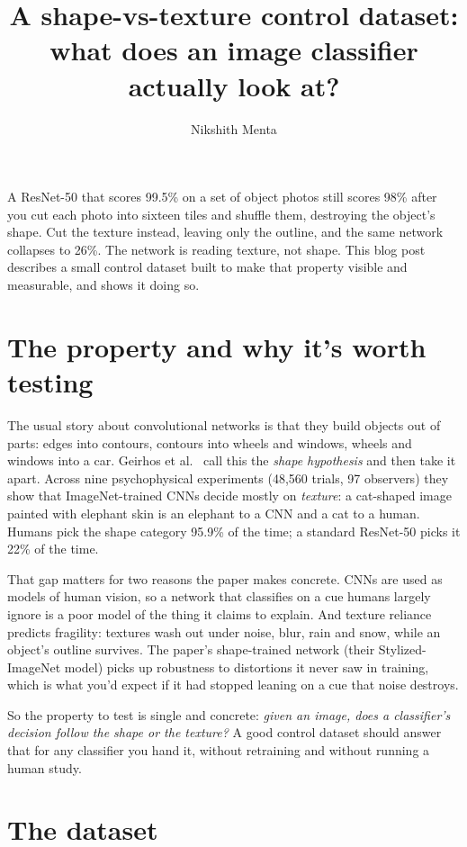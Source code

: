 \documentclass[11pt]{article}
\title{A shape-vs-texture control dataset:\\
       what does an image classifier actually look at?}
\author{Nikshith Menta}
\date{}
\begin{document}
\maketitle

A ResNet-50 that scores 99.5\% on a set of object photos still scores 98\% after
you cut each photo into sixteen tiles and shuffle them, destroying the object's
shape. Cut the texture instead, leaving only the outline, and the same network
collapses to 26\%. The network is reading texture, not shape. This blog post
describes a small control dataset built to make that property visible and
measurable, and shows it doing so.

\section{The property and why it's worth testing}

The usual story about convolutional networks is that they build objects out of
parts: edges into contours, contours into wheels and windows, wheels and windows
into a car. Geirhos et al.\ \cite{geirhos2019} call this the \emph{shape
hypothesis} and then take it apart. Across nine psychophysical experiments
(48{,}560 trials, 97 observers) they show that ImageNet-trained CNNs decide
mostly on \emph{texture}: a cat-shaped image painted with elephant skin is an
elephant to a CNN and a cat to a human. Humans pick the shape category 95.9\% of
the time; a standard ResNet-50 picks it 22\% of the time.

That gap matters for two reasons the paper makes concrete. CNNs are used as
models of human vision, so a network that classifies on a cue humans largely
ignore is a poor model of the thing it claims to explain. And texture reliance
predicts fragility: textures wash out under noise, blur, rain and snow, while an
object's outline survives. The paper's shape-trained network (their
Stylized-ImageNet model) picks up robustness to distortions it never saw in
training, which is what you'd expect if it had stopped leaning on a cue that
noise destroys.

So the property to test is single and concrete: \emph{given an image, does a
classifier's decision follow the shape or the texture?} A good control dataset
should answer that for any classifier you hand it, without retraining and without
running a human study.

\section{The dataset}
\end{document}
